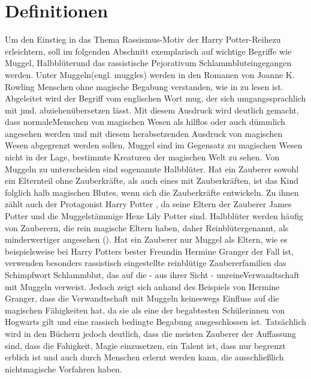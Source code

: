 \section{Definitionen}
Um den Einstieg in das Thema \glqq Rassismus-Motiv der  \glq Harry Potter\grq-Reihe\grqq zu erleichtern, soll im folgenden Abschnitt exemplarisch auf wichtige Begriffe wie \glqq Muggel\grqq, \glqq Halbblüter\grqq und das rassistische Pejorativum \glqq Schlammblut\grqq eingegangen werden.
Unter \glqq Muggeln\grqq (engl. muggles) werden in den Romanen von Joanne K. Rowling Menschen ohne magische Begabung verstanden, wie in \cite[S. 61]{JKR97} zu lesen ist. Abgeleitet wird der Begriff vom englischen Wort mug, der sich umgangssprachlich mit \glqq jmd. abziehen\grqq übersetzen lässt. Mit diesem Ausdruck wird deutlich gemacht, dass \glqq normale\grqq Menschen von magischen Wesen als hilflos oder auch dümmlich angesehen werden und mit diesem herabsetzenden Ausdruck von magischen Wesen abgegrenzt werden sollen. Muggel sind im Gegensatz zu magischen Wesen nicht in der Lage, bestimmte Kreaturen der magischen Welt zu sehen.
Von Muggeln zu unterscheiden sind sogenannte \glqq Halbblüter\grqq. Hat ein Zauberer sowohl ein Elternteil ohne Zauberkräfte, als auch eines mit Zauberkräften, ist das Kind folglich halb magischen \glqq Blutes\grqq, wenn sich die Zauberkräfte entwickeln. Zu ihnen zählt auch der Protagonist Harry Potter , da seine Eltern der Zauberer James Potter und die Muggelstämmige Hexe Lily Potter sind.
Halbblüter werden häufig von Zauberern, die rein magische Eltern haben, daher \glqq Reinblüter\grqq genannt, als minderwertiger angesehen (\cite[S.220]{JKR03}). Hat ein Zauberer nur Muggel als Eltern, wie es beispielsweise bei Harry Potters bester Freundin Hermine Granger der Fall ist, verwenden besonders rassistisch eingestellte reinblütige Zaubererfamilien das Schimpfwort \glqq Schlammblut\grqq, das auf die - aus ihrer Sicht -  \glqq unreine\grqq Verwandtschaft mit Muggeln verweist.
Jedoch zeigt sich anhand des Beispiels von Hermine Granger, dass die Verwandtschaft mit Muggeln keineswegs Einfluss auf die magischen Fähigkeiten hat, da sie als eine der begabtesten Schülerinnen von Hogwarts gilt und eine rassisch bedingte Begabung ausgeschlossen ist.
Tatsächlich wird in den Büchern jedoch deutlich, dass die meisten Zauberer der Auffassung sind, dass die Fahigkeit, Magie einzusetzen, ein Talent ist, dass nur begrenzt erblich ist und auch durch Menschen erlernt werden kann, die ausschließlich nichtmagische Vorfahren haben. 

